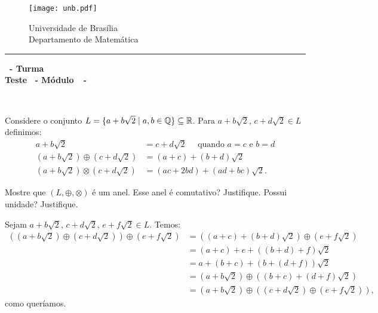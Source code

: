 \documentclass[12pt]{exam}
\begin{document}
    \begin{figure}[h]
        \begin{minipage}[c]{1.7cm}
            \texttt{[image: unb.pdf]}
        \end{minipage}
        \hspace{0pt}
        \begin{minipage}[c]{4in}
            {Universidade de Brasília} \\
            {Departamento de Matemática}
        \end{minipage}
    \end{figure}
    \hrule
    \begin{center}
        {\Large\bf \disciplina\ - Turma \turma}  \\
         {\large\bf Teste \numeroteste\ - Módulo\ \modulo\ -\ \dataavaliacao}
    \end{center}

    \\
    \vspace*{.01cm}

    \vspace{.4cm}

    \questao{} Considere o conjunto $L = \{ a + b\sqrt{2} \mid a, b \in \mathbb{Q}\} \subseteq \mathbb{R}$. Para $a + b\sqrt{2}$, $c + d\sqrt{2} \in L$ definimos:
    \begin{align*}
        a + b\sqrt{2} &= c + d\sqrt{2} \quad \mbox{ quando } a = c \mbox{ e } b = d\\
        (a + b\sqrt{2}) \oplus (c + d\sqrt{2}) &= (a + c) + (b + d)\sqrt{2}\\
        (a + b\sqrt{2}) \otimes (c + d\sqrt{2}) &= (ac + 2bd) + (ad + bc)\sqrt{2}.
    \end{align*}

    Mostre que $(L, \oplus, \otimes)$ é um anel. Esse anel é comutativo? Justifique. Possui unidade? Justifique.

    \solucao Sejam $a + b\sqrt{2}$, $c + d\sqrt{2}$, $e + f\sqrt{2} \in L$. Temos:
    \begin{align*}
        ((a + b\sqrt{2}) \oplus (c + d\sqrt{2})) \oplus (e + f\sqrt{2}) &= ((a + c) + (b + d)\sqrt{2}) \oplus (e + f\sqrt{2})\\ &= (a + c) + e + ((b + d) + f)\sqrt{2} \\ &= a + (b + c) + (b + (d + f))\sqrt{2} \\ &= (a + b\sqrt{2}) \oplus ((b + c) + (d + f)\sqrt{2}) \\ &= (a + b\sqrt{2}) \oplus ((c + d\sqrt{2}) \oplus (e + f\sqrt{2})),
    \end{align*}
    como queríamos.
\end{document}
